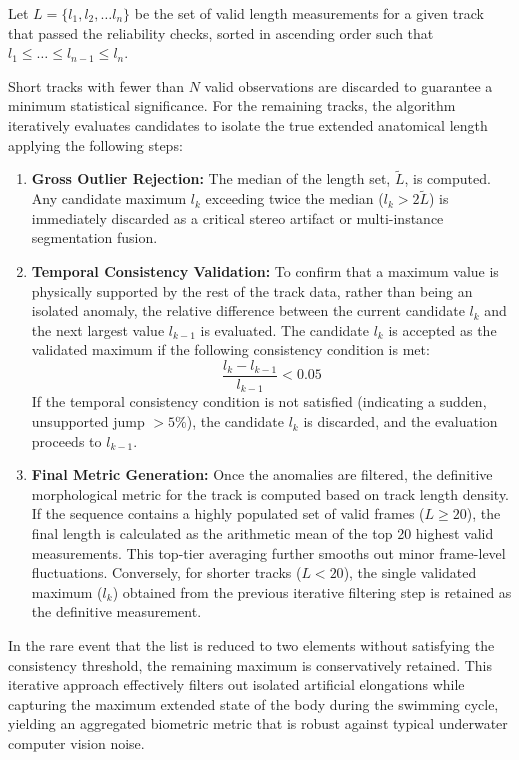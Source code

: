 \documentclass[utf8]{FrontiersinHarvard} %
\begin{document}
Let $L = \{l_1, l_2, \dots l_n\}$ 
be the set of valid length measurements for a given track that passed the reliability checks, sorted in ascending order such that  $l_1 \leq \dots \leq l_{n-1} \leq l_{n}$.

Short tracks with fewer than $N$ valid observations are discarded to guarantee a minimum statistical significance. For the remaining tracks, the algorithm iteratively evaluates candidates to isolate the true extended anatomical length applying the following steps:

\begin{enumerate}
    \item \textbf{Gross Outlier Rejection:} The median of the length set, $\tilde{L}$, is computed. Any candidate maximum $l_k$ exceeding twice the median ($l_k > 2\tilde{L}$) is immediately discarded as a critical stereo artifact or multi-instance segmentation fusion.
    
    \item \textbf{Temporal Consistency Validation:} To confirm that a maximum value is physically supported by the rest of the track data, rather than being an isolated anomaly, the relative difference between the current candidate $l_k$ and the next largest value $l_{k-1}$ is evaluated. The candidate $l_k$ is accepted as the validated maximum if the following consistency condition is met:
    \begin{equation}
        \frac{l_k - l_{k-1}}{l_{k-1}} < 0.05
    \end{equation}
    If the temporal consistency condition is not satisfied (indicating a sudden, unsupported jump $>5\%$), the candidate $l_k$ is discarded, and the evaluation proceeds to $l_{k-1}$. 
    
    \item \textbf{Final Metric Generation:} Once the anomalies are filtered, the definitive morphological metric for the track is computed based on track length density. If the sequence contains a highly populated set of valid frames ($L \ge 20$), the final length is calculated as the arithmetic mean of the top 20 highest valid measurements. This top-tier averaging further smooths out minor frame-level fluctuations. Conversely, for shorter tracks ($L < 20$), the single validated maximum ($l_k$) obtained from the previous iterative filtering step is retained as the definitive measurement.
    
\end{enumerate}

In the rare event that the list is reduced to two elements without satisfying the consistency threshold, the remaining maximum is conservatively retained. This iterative approach effectively filters out isolated artificial elongations while capturing the maximum extended state of the body during the swimming cycle, yielding an aggregated biometric metric that is robust against typical underwater computer vision noise.
\end{document}
